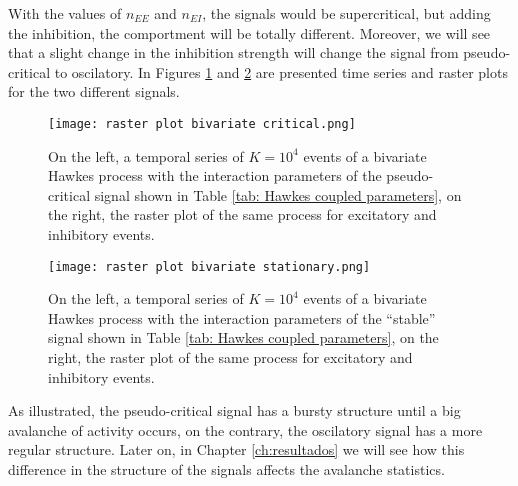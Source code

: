 With the values of $n_{EE}$ and $n_{EI}$, the signals would be supercritical, but adding the inhibition, the comportment will be totally different. Moreover, we will see that a 
slight change in the inhibition strength will change the signal from pseudo-critical to oscilatory. In Figures \ref{f: Hawkes coupled pseudo} and \ref{f: Hawkes coupled oscilatory}
are presented time series and raster plots for the two different signals.

\begin{figure}[H]
    \centering
    \texttt{[image: raster plot bivariate critical.png]}
    \caption{On the left, a temporal series of $K=10^4$ events of a bivariate Hawkes process with the interaction parameters of the pseudo-critical signal shown in Table \ref{tab: Hawkes coupled parameters},
    on the right, the raster plot of the same process for excitatory and inhibitory events.}
    \label{f: Hawkes coupled pseudo}
\end{figure}

\begin{figure}[H]
    \centering
    \texttt{[image: raster plot bivariate stationary.png]}
    \caption{On the left, a temporal series of $K=10^4$ events of a bivariate Hawkes process with the interaction parameters of the ``stable'' signal shown in Table \ref{tab: Hawkes coupled parameters},
    on the right, the raster plot of the same process for excitatory and inhibitory events.}
    \label{f: Hawkes coupled oscilatory}
\end{figure}

As illustrated, the pseudo-critical signal has a bursty structure until a big avalanche of activity occurs, on the contrary, the oscilatory signal has a more regular structure. Later on,
in Chapter \ref{ch:resultados} we will see how this difference in the structure of the signals affects the avalanche statistics.


